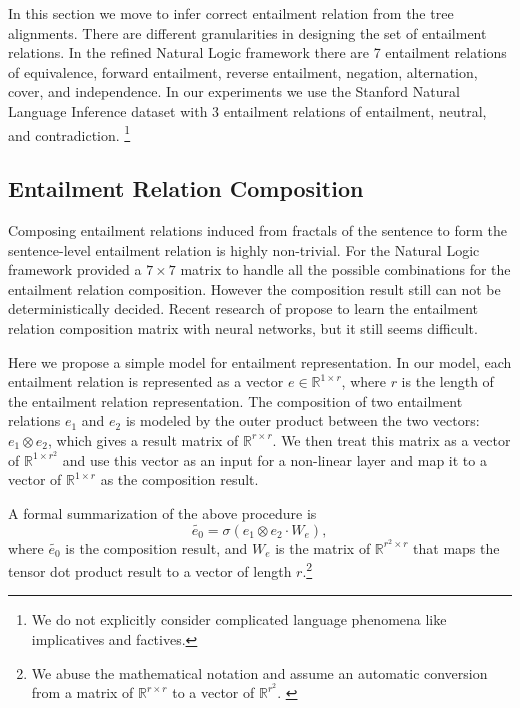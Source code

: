 
In this section we move to infer correct entailment relation
from the tree alignments.
There are different granularities in designing the 
set of entailment relations. 
In the refined Natural Logic framework \cite{maccartney2009extended}
there are 7 entailment relations of equivalence, forward entailment,
reverse entailment, negation, alternation, cover, and independence.
In our experiments we use the Stanford Natural Language Inference
\cite{bowman2015large} dataset with 3 entailment relations of
entailment, neutral, and contradiction. \footnote{
We do not explicitly consider complicated language phenomena like
implicatives and factives.}


\subsection{Entailment Relation Composition}
Composing entailment relations induced from fractals of the sentence
to form the sentence-level entailment relation is highly non-trivial.
For the Natural Logic framework 
provided a $7\times 7$ matrix to handle all the possible combinations for
the entailment relation composition. However the composition result
still can not be deterministically decided.
Recent research of 
propose to learn the entailment relation composition matrix 
with neural networks, but it still seems difficult.

Here we propose a simple model for entailment representation.
In our model, each entailment relation is represented as a vector 
$e\in \mathbb{R}^{1\times r}$, where $r$ is the length
of the entailment relation representation.
The composition of two entailment relations $e_1$
and $e_2$ is modeled by the outer product between the two vectors:
$e_1\otimes e_2$, which gives a result matrix of $\mathbb{R}^{r\times r}$.
We then treat this matrix as a vector of $\mathbb{R}^{1\times r^2}$
and use this vector as an input for a non-linear layer
and map it to a vector of $\mathbb{R}^{1\times r}$ as the
composition result.

A formal summarization of the above procedure is
\[\tilde{e_0} = \sigma(e_1\otimes e_2\cdot W_e),\]
where $\tilde{e_0}$ is the composition result,
and $W_e$ is the matrix of $\mathbb{R}^{r^2 \times r}$
that maps the tensor dot product result to a vector of 
length $r$.\footnote{We abuse the mathematical notation
and assume an automatic conversion from a matrix of 
$\mathbb{R}^{r\times r}$ to a vector of $\mathbb{R}^{r^2}$.
\label{footnote:abuse2}}

